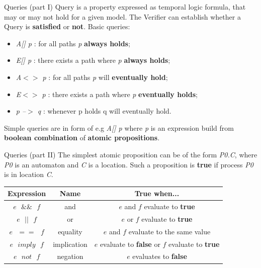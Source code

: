 \documentclass{beamer}
\begin{document}
\begin{frame}{Queries (part I)}	
	Query is a property expressed as temporal logic formula, that may or may not hold for a given model. The Verifier can establish whether a Query is \textbf{satisfied} or \textbf{not}.\newline
	Basic queries:
	\begin{itemize}
		\item \textit{A[] p} : for all paths \textit{p} \textbf{always holds};
		\item \textit{E[] p} : there exists a path where \textit{p} \textbf{always holds};		
		\item \textit{A$<>$ p} : for all paths \textit{p} will \textbf{eventually hold};
		\item \textit{E$<>$ p} : there exists a path where \textit{p} \textbf{eventually holds};
		\item \textit{p --$>$ q} : whenever p holds q will eventually hold.

	\end{itemize}
	
	Simple queries are in form of e.g \textit{A[] p} where \textit{p} is an expression build from \textbf{boolean combination} of \textbf{atomic propositions}.
\end{frame}

\begin{frame}{Queries (part II)}
	The simplest atomic proposition can be of the form \textit{P0.C}, where \textit{P0} is an automaton and \textit{C} is a location. Such a proposition is \textbf{true} if process \textit{P0} is in location \textit{C}.\newline
	
	\begin{tabular}{|c|c|c|}
		\hline \textbf{Expression} & \textbf{Name} & \textbf{True when...} \\ 
		\hline $e\text{ }\&\&\text{ }f$ & and & $e$ and $f$ evaluate to \textbf{true}	 \\ 
		\hline $e\text{ }||\text{ }f$ & or & $e$ or $f$ evaluate to \textbf{true} \\ 
		\hline $e\text{ }==\text{ }f$ & equality & $e$ and $f$ evaluate to the same value \\ 
		\hline $e\text{ }imply\text{ }f$ & implication & $e$ evaluate to \textbf{false} or $f$ evaluate to \textbf{true}\\ 
		\hline $e\text{ }not\text{ }f$ & negation & $e$ evaluates to \textbf{false} \\ 
		\hline 
	\end{tabular} 

\end{frame}
\end{document}
